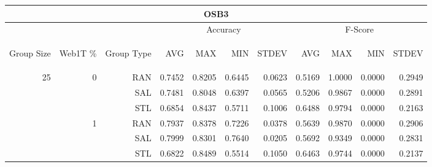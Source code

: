 \begin{center}
\begin{table}[htbp] 
 \begin{center}
\begin{tabular}{ | r | r | r | r | r | r | r | r | r | r | r |}
\hline
\multicolumn{11}{|c|}{OSB3}\\
\hline
 & & & \multicolumn{4}{|c|}{Accuracy} & \multicolumn{4}{|c|}{F-Score}\\ \cline{4-11}
\begin{sideways}Group Size\end{sideways} & \begin{sideways}Web1T \%\end{sideways} & \begin{sideways}Group Type\end{sideways} & \begin{sideways}AVG\end{sideways} & \begin{sideways}MAX\end{sideways} & \begin{sideways}MIN\end{sideways} & \begin{sideways}STDEV\end{sideways} & \begin{sideways}AVG\end{sideways} & \begin{sideways}MAX\end{sideways} & \begin{sideways}MIN\end{sideways} & \begin{sideways}STDEV\end{sideways}\\
\hline
\multirow{18}{*}{25}
 & \multirow{3}{*}{0} & RAN & 0.7452 & 0.8205 & 0.6445 & 0.0623 & 0.5169 & 1.0000 & 0.0000 & 0.2949\\ \cline{3-11}
 &   & SAL & 0.7481 & 0.8048 & 0.6397 & 0.0565 & 0.5206 & 0.9867 & 0.0000 & 0.2891\\ \cline{3-11}
 &   & STL & 0.6854 & 0.8437 & 0.5711 & 0.1006 & 0.6488 & 0.9794 & 0.0000 & 0.2163\\ \cline{2-11}
 & \multirow{3}{*}{1} & RAN & 0.7937 & 0.8378 & 0.7226 & 0.0378 & 0.5639 & 0.9870 & 0.0000 & 0.2906\\ \cline{3-11}
 &   & SAL & 0.7999 & 0.8301 & 0.7640 & 0.0205 & 0.5692 & 0.9349 & 0.0000 & 0.2831\\ \cline{3-11}
 &   & STL & 0.6822 & 0.8489 & 0.5514 & 0.1050 & 0.6463 & 0.9744 & 0.0000 & 0.2137\\ \cline{2-11}

\end{tabular}
\end{center}
\end{table}
\end{center}
